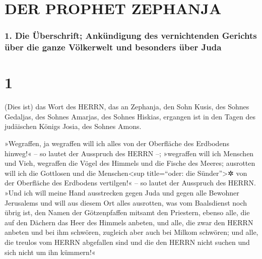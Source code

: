 \hypertarget{der-prophet-zephanja}{%
\section{DER PROPHET ZEPHANJA}\label{der-prophet-zephanja}}

\hypertarget{die-uxfcberschrift-ankuxfcndigung-des-vernichtenden-gerichts-uxfcber-die-ganze-vuxf6lkerwelt-und-besonders-uxfcber-juda}{%
\subsubsection{1. Die Überschrift; Ankündigung des vernichtenden
Gerichts über die ganze Völkerwelt und besonders über
Juda}\label{die-uxfcberschrift-ankuxfcndigung-des-vernichtenden-gerichts-uxfcber-die-ganze-vuxf6lkerwelt-und-besonders-uxfcber-juda}}

\hypertarget{section}{%
\section{1}\label{section}}

 (Dies ist) das Wort des HERRN, das an Zephanja, den Sohn
Kusis, des Sohnes Gedaljas, des Sohnes Amarjas, des Sohnes Hiskias,
ergangen ist in den Tagen des judäischen Königs Josia, des Sohnes Amons.

 »Wegraffen, ja wegraffen will ich alles von der
Oberfläche des Erdbodens hinweg!« -- so lautet der Ausspruch des HERRN
--;  »wegraffen will ich Menschen und Vieh, wegraffen die
Vögel des Himmels und die Fische des Meeres; ausrotten will ich die
Gottlosen und die Menschen\textless sup title=``oder: die
Sünder''\textgreater✲ von der Oberfläche des Erdbodens vertilgen!« -- so
lautet der Ausspruch des HERRN.  »Und ich will meine Hand
ausstrecken gegen Juda und gegen alle Bewohner Jerusalems und will aus
diesem Ort alles ausrotten, was vom Baalsdienst noch übrig ist, den
Namen der Götzenpfaffen mitsamt den Priestern,  ebenso
alle, die auf den Dächern das Heer des Himmels anbeten, und alle, die
zwar den HERRN anbeten und bei ihm schwören, zugleich aber auch bei
Milkom schwören;  und alle, die treulos vom HERRN
abgefallen sind und die den HERRN nicht suchen und sich nicht um ihn
kümmern!«

